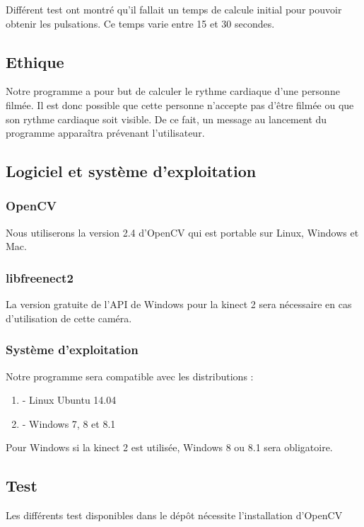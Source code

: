 \documentclass[12pt,a4paper]{article}
\begin{document}
Différent test ont montré qu'il fallait un temps de calcule initial pour pouvoir obtenir les pulsations. Ce temps varie entre 15 et 30 secondes.

\subsection{Ethique}

Notre programme a pour but de calculer le rythme cardiaque d'une personne filmée. Il est donc possible que cette personne n'accepte pas d'être filmée ou que son rythme cardiaque soit visible. De ce fait, un message au lancement du programme apparaîtra prévenant l'utilisateur.
\newpage
\subsection{Logiciel et système d'exploitation}

\subsubsection{OpenCV}

Nous utiliserons la version 2.4 d'OpenCV qui est portable sur Linux, Windows et Mac.

\subsubsection{libfreenect2}

La version gratuite de l'API de Windows pour la kinect 2 sera nécessaire en cas d'utilisation de cette caméra.


\subsubsection{Système d'exploitation}

Notre programme sera compatible avec les distributions : 
\begin{enumerate}
\item[] - Linux Ubuntu 14.04
\item[] - Windows 7, 8 et 8.1
\end{enumerate}
Pour Windows si la kinect 2 est utilisée, Windows 8 ou 8.1 sera obligatoire.

\subsection{Test}
Les différents test disponibles dans le dépôt nécessite l'installation d'OpenCV
\end{document}
